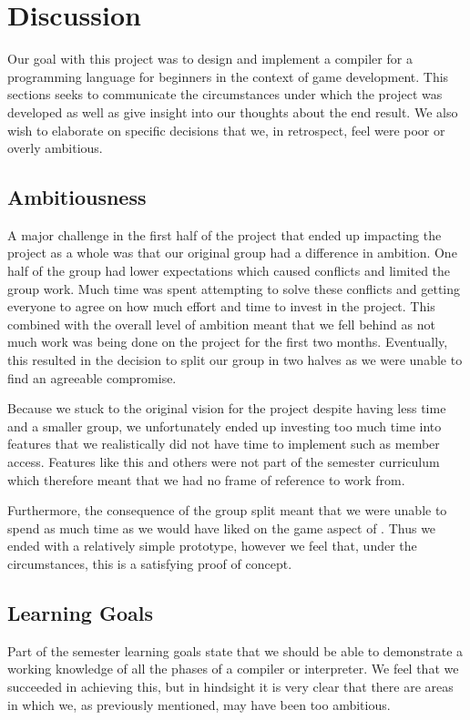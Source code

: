 \chapter{Discussion}
Our goal with this project was to design and implement a compiler for a programming language for beginners in the context of game development. 
This sections seeks to communicate the circumstances under which the project was developed as well as give insight into our thoughts about the end result.
We also wish to elaborate on specific decisions that we, in retrospect, feel were poor or overly ambitious.

\section{Ambitiousness}
A major challenge in the first half of the project that ended up impacting the project as a whole was that our original group had a difference in ambition. 
One half of the group had lower expectations which caused conflicts and limited the group work.
Much time was spent attempting to solve these conflicts and getting everyone to agree on how much effort and time to invest in the project.
This combined with the overall level of ambition meant that we fell behind as not much work was being done on the project for the first two months. 
Eventually, this resulted in the decision to split our group in two halves as we were unable to find an agreeable compromise.

Because we stuck to the original vision for the project despite having less time and a smaller group, we unfortunately ended up investing too much time into features that we realistically did not have time to implement such as member access.
Features like this and others were not part of the semester curriculum which therefore meant that we had no frame of reference to work from.

Furthermore, the consequence of the group split meant that we were unable to spend as much time as we would have liked on the game aspect of \dazel{}. 
Thus we ended with a relatively simple prototype, however we feel that, under the circumstances, this is a satisfying proof of concept.

\section{Learning Goals}
Part of the semester learning goals state that we should be able to demonstrate a working knowledge of all the phases of a compiler or interpreter. We feel that we succeeded in achieving this, but in hindsight it is very clear that there are areas in which we, as previously mentioned, may have been too ambitious. 

